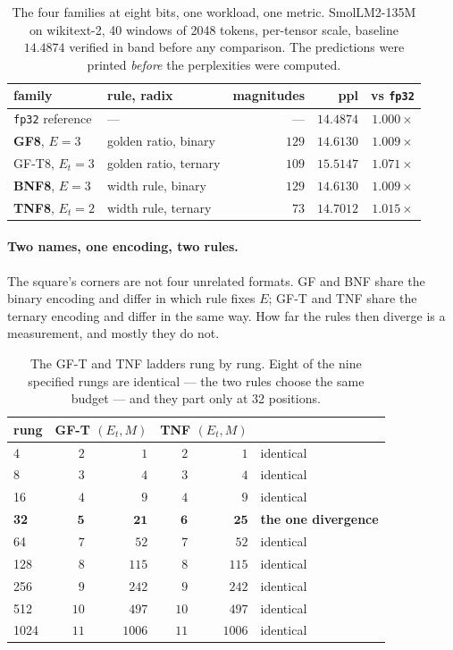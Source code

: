 \documentclass[11pt]{article}
\theoremstyle{definition}
\begin{document}
\begin{table}[t]\centering
\caption{The four families at eight bits, one workload, one metric.
SmolLM2-135M on wikitext-2, 40 windows of 2048 tokens, per-tensor scale,
baseline $14.4874$ verified in band before any comparison. The predictions were
printed \emph{before} the perplexities were computed.}
\label{tab:fourfam}
\begin{tabular}{llrrr}
\toprule
family & rule, radix & magnitudes & ppl & vs \texttt{fp32} \\
\midrule
\texttt{fp32} reference & --- & --- & $14.4874$ & $1.000\times$ \\
\midrule
\textbf{GF8}, $E{=}3$   & golden ratio, binary  & $129$ & $\mathbf{14.6130}$ & $1.009\times$ \\
GF-T8, $E_t{=}3$        & golden ratio, ternary & $109$ & $15.5147$ & $1.071\times$ \\
\textbf{BNF8}, $E{=}3$  & width rule, binary    & $129$ & $\mathbf{14.6130}$ & $1.009\times$ \\
\textbf{TNF8}, $E_t{=}2$& width rule, ternary   & $73$  & $\mathbf{14.7012}$ & $1.015\times$ \\
\bottomrule
\end{tabular}
\end{table}

\paragraph{Two names, one encoding, two rules.} The square's corners are not
four unrelated formats. GF and BNF share the binary encoding and differ in which
rule fixes $E$; GF-T and TNF share the ternary encoding and differ in the same
way. How far the rules then diverge is a measurement, and mostly they do not.

\begin{table}[t]\centering
\caption{The GF-T and TNF ladders rung by rung. Eight of the nine specified
rungs are identical --- the two rules choose the same budget --- and they part
only at 32 positions.}
\label{tab:gftvstnf}
\begin{tabular}{lrrrrl}
\toprule
rung & \multicolumn{2}{c}{GF-T $(E_t, M)$} & \multicolumn{2}{c}{TNF $(E_t, M)$} & \\
\midrule
4    & $2$ & $1$    & $2$ & $1$    & identical \\
8    & $3$ & $4$    & $3$ & $4$    & identical \\
16   & $4$ & $9$    & $4$ & $9$    & identical \\
\textbf{32} & $\mathbf{5}$ & $\mathbf{21}$ & $\mathbf{6}$ & $\mathbf{25}$ & \textbf{the one divergence} \\
64   & $7$ & $52$   & $7$ & $52$   & identical \\
128  & $8$ & $115$  & $8$ & $115$  & identical \\
256  & $9$ & $242$  & $9$ & $242$  & identical \\
512  & $10$ & $497$ & $10$ & $497$ & identical \\
1024 & $11$ & $1006$& $11$ & $1006$& identical \\
\bottomrule
\end{tabular}
\end{table}
\end{document}

